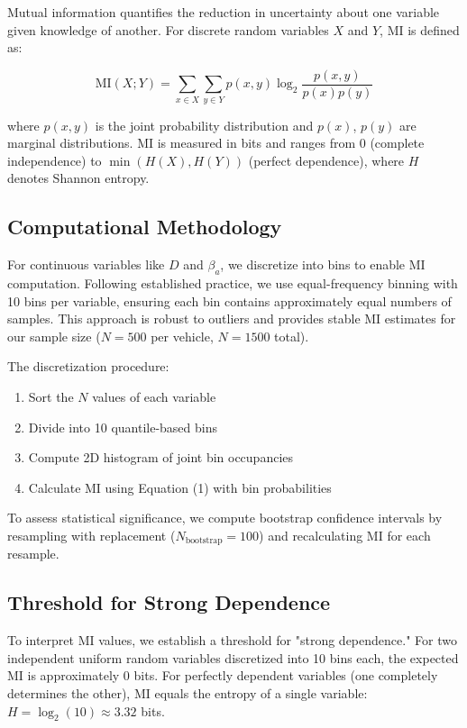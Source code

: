 \documentclass[11pt]{article}
\begin{document}
Mutual information quantifies the reduction in uncertainty about one variable given knowledge of another. For discrete random variables $X$ and $Y$, MI is defined as:

\begin{equation}
\text{MI}(X;Y) = \sum_{x \in X} \sum_{y \in Y} p(x,y) \log_2 \frac{p(x,y)}{p(x)p(y)}
\end{equation}

where $p(x,y)$ is the joint probability distribution and $p(x)$, $p(y)$ are marginal distributions. MI is measured in bits and ranges from 0 (complete independence) to $\min(H(X), H(Y))$ (perfect dependence), where $H$ denotes Shannon entropy.

\subsection{Computational Methodology}

For continuous variables like $D$ and $\beta_a$, we discretize into bins to enable MI computation. Following established practice\cite{Kraskov2004}, we use equal-frequency binning with 10 bins per variable, ensuring each bin contains approximately equal numbers of samples. This approach is robust to outliers and provides stable MI estimates for our sample size ($N = 500$ per vehicle, $N = 1500$ total).

The discretization procedure:
\begin{enumerate}
\item Sort the $N$ values of each variable
\item Divide into 10 quantile-based bins
\item Compute 2D histogram of joint bin occupancies
\item Calculate MI using Equation (1) with bin probabilities
\end{enumerate}

To assess statistical significance, we compute bootstrap confidence intervals by resampling with replacement ($N_{\text{bootstrap}} = 100$) and recalculating MI for each resample.

\subsection{Threshold for Strong Dependence}

To interpret MI values, we establish a threshold for "strong dependence." For two independent uniform random variables discretized into 10 bins each, the expected MI is approximately 0 bits. For perfectly dependent variables (one completely determines the other), MI equals the entropy of a single variable: $H = \log_2(10) \approx 3.32$ bits.
\end{document}
